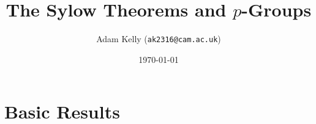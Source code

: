 \documentclass[a4paper]{amsart}
\title{The Sylow Theorems and $p$-Groups}
\author{Adam Kelly (\texttt{ak2316@cam.ac.uk})}
\date{\today}
\begin{document}
\maketitle


\section{Basic Results}
\end{document}

